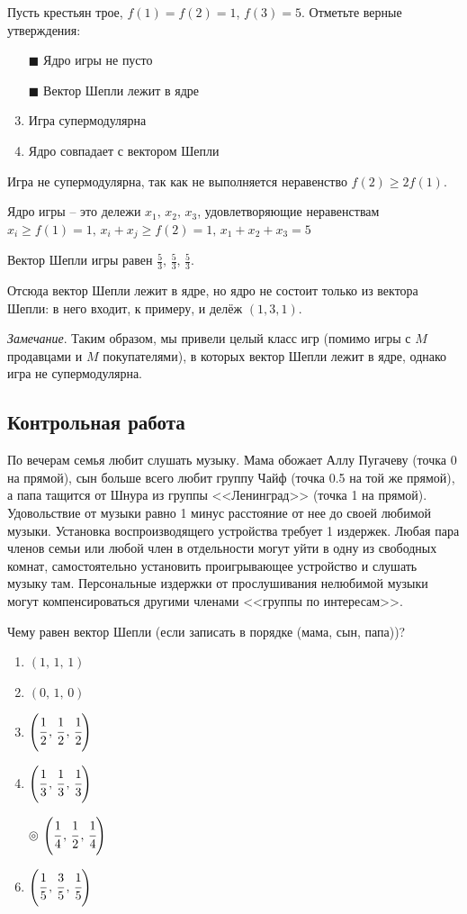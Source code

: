 	Пусть крестьян трое, $f(1)=f(2)=1$, $f(3)=5$. Отметьте верные утверждения:
	
	\begin{enumerate}[label=$\square$]
		\item[$\blacksquare$] Ядро игры не пусто
		\item[$\blacksquare$] Вектор Шепли лежит в ядре
		\item Игра супермодулярна
		\item Ядро совпадает с вектором Шепли
	\end{enumerate}

	\solution
	Игра не супермодулярна, так как не выполняется неравенство $f(2) \geq 2f(1)$.
	
	Ядро игры -- это дележи $x_1,\,x_2,\,x_3$, удовлетворяющие неравенствам $x_i \geq f(1)=1,\, x_i+x_j \geq f(2)=1,\, x_1+x_2+x_3=5$
	
	Вектор Шепли игры равен $\frac{5}{3},\,\frac{5}{3},\,\frac{5}{3}$.
	
	Отсюда вектор Шепли лежит в ядре, но ядро не состоит только из вектора Шепли: в него входит, к примеру, и делёж $(1,3,1)$.
	
	\textit{Замечание}. Таким образом, мы привели целый класс игр (помимо игры с $M$ продавцами и $M$ покупателями), в которых вектор Шепли лежит в ядре, однако игра не супермодулярна.
	
	\subsection{Контрольная работа}
	
	\task
	По вечерам семья любит слушать музыку. Мама обожает Аллу Пугачеву (точка 0 на прямой), сын больше всего любит группу Чайф (точка 0.5 на той же прямой), а папа тащится от Шнура из группы <<Ленинград>> (точка 1 на прямой). Удовольствие от музыки равно 1 минус расстояние от нее до своей любимой музыки. Установка воспроизводящего устройства требует 1 издержек. Любая пара членов семьи или любой член в отдельности могут уйти в одну из свободных комнат, самостоятельно установить проигрывающее устройство и слушать музыку там. Персональные издержки от прослушивания нелюбимой музыки могут компенсироваться другими членами <<группы по интересам>>.
	
	Чему равен вектор Шепли (если записать в порядке (мама, сын, папа))?
	
	\begin{enumerate}[label=$\circ$]
		\item $(1,\, 1,\, 1)$
		\item $(0,\, 1,\, 0)$
		\item $\left(\cfrac{1}{2}\, ,\, \cfrac{1}{2}\, ,\, \cfrac{1}{2}\right)$
		\item $\left(\cfrac{1}{3}\, ,\, \cfrac{1}{3}\, ,\, \cfrac{1}{3}\right)$
		\item[$\circledcirc$] $\left(\cfrac{1}{4}\, ,\, \cfrac{1}{2}\, ,\, \cfrac{1}{4}\right)$
		\item $\left(\cfrac{1}{5}\, ,\, \cfrac{3}{5}\, ,\, \cfrac{1}{5}\right)$
	\end{enumerate}
	
